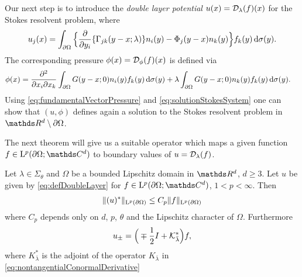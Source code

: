 Our next step is to introduce the \emph{double layer potential} $u(x) = \mathcal{D}_\lambda(f)(x)$ for the Stokes resolvent problem, where
\begin{align}
  \label{eq:defDoubleLayer}
  u_j(x) = \int_{\partial\Omega} \Big\{ \frac{\partial}{\partial y_i} \{ \Gamma_{jk}(y - x; \lambda) \} n_i(y) - \Phi_j(y - x) n_k(y) \Big\} f_k(y) \, {\operatorname{d}\!{\sigma}}(y).
\end{align}
The corresponding pressure $\phi(x) = \mathcal{D}_{\phi}(f)(x)$ is defined via
\begin{align}
  \label{eq:defDoubleLayerPressure}
  \phi(x)
  &= \frac{\partial^2}{\partial x_i \partial x_k} \int_{\partial\Omega} G(y - x; 0) n_i(y) f_k(y) \, {\operatorname{d}\!{\sigma}}(y) + \lambda \int_{\partial\Omega} G(y - x; 0) n_k(y) f_k(y) \, {\operatorname{d}\!{\sigma}}(y).
\end{align}
Using \ref{eq:fundamentalVectorPressure} and \ref{eq:solutionStokesSystem} one can show that $(u,\phi)$ defines again a solution to the Stokes resolvent problem in $\R^d \setminus \partial\Omega$.

The next theorem will give us a suitable operator which maps a given function $f \in \Ell^p(\partial\Omega; \C^d)$ to boundary values of $u = \mathcal{D}_\lambda(f)$.

\begin{thm}
  \label{thm:nontangentialLimitDoubleLayer}
Let $\lambda \in \Sigma_\theta$ and $\Omega$ be a bounded Lipschitz domain in $\R^d$, $d \geq 3$.
Let $u$ be given by \eqref{eq:defDoubleLayer} for $f \in \Ell^p(\partial\Omega; \C^d)$, $1 < p < \infty$.
Then
\begin{align}
  \label{eq:lpBoundednessUNontangentialMax}
  \|(u)^*\|_{\mathrm{L}^p(\partial\Omega)} \leq C_p \|f\|_{\mathrm{L}^p(\partial\Omega)}
\end{align}
where $C_p$ depends only on $d$, $p$, $\theta$ and the Lipschitz character of $\Omega$.
Furthermore 
\begin{align}
  \label{eq:nontangentialLimitDoubleLayer}
  u_\pm = \Big(\mp \frac{1}{2} I + \mathcal{K}_{\bar\lambda}^* \Big) f,
\end{align}
where $K_{\bar\lambda}^*$ is the adjoint of the operator $K_{\bar\lambda}$ in \eqref{eq:nontangentialConormalDerivative}
\end{thm}

